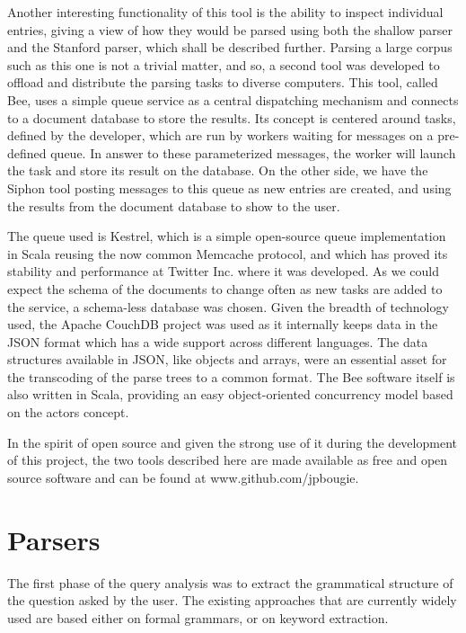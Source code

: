 Another interesting functionality of this tool is the ability to inspect individual entries, giving a view of how they would be parsed using both the shallow parser and the Stanford parser, which shall be described further. Parsing a large corpus such as this one is not a trivial matter, and so, a second tool was developed to offload and distribute the parsing tasks to diverse computers. This tool, called Bee, uses a simple queue service as a central dispatching mechanism and connects to a document database to store the results. Its concept is centered around tasks, defined by the developer, which are run by workers waiting for messages on a pre-defined queue. In answer to these parameterized messages, the worker will launch the task and store its result on the database. On the other side, we have the Siphon tool posting messages to this queue as new entries are created, and using the results from the document database to show to the user.

The queue used is Kestrel, which is a simple open-source queue implementation in Scala reusing the now common Memcache protocol, and which has proved its stability and performance at Twitter Inc. where it was developed. As we could expect the schema of the documents to change often as new tasks are added to the service, a schema-less database was chosen. Given the breadth of technology used, the Apache CouchDB project was used as it internally keeps data in the JSON format which has a wide support across different languages. The data structures available in JSON, like objects and arrays, were an essential asset for the transcoding of the parse trees to a common format. The Bee software itself is also written in Scala, providing an easy object-oriented concurrency model based on the actors concept.

In the spirit of open source and given the strong use of it during the development of this project, the two tools described here are made available as free and open source software and can be found at www.github.com/jpbougie.


\section{Parsers} %
\label{sec:parsers}

The first phase of the query analysis was to extract the grammatical structure of the question asked by the user. The existing approaches that are currently widely used are based either on formal grammars, or on keyword extraction.

